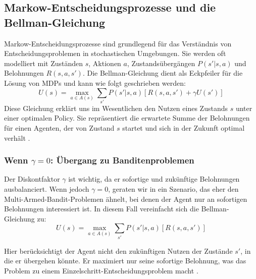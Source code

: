 

\subsection{Markow-Entscheidungsprozesse und die Bellman-Gleichung}

Markow-Entscheidungsprozesse sind grundlegend für das Verständnis von Entscheidungsproblemen in stochastischen Umgebungen. Sie werden oft modelliert mit Zuständen \( s \), Aktionen \( a \), Zustandsübergängen \( P(s' | s, a) \) und Belohnungen \( R(s, a, s') \). Die Bellman-Gleichung dient als Eckpfeiler für die Lösung von MDPs und kann wie folgt geschrieben werden:
\[
U(s) = \max_{a \in A(s)} \sum_{s'} P(s' | s, a) \left[ R(s, a, s') + \gamma U(s') \right]
\label{eq: Bellman }
\]
Diese Gleichung erklärt uns im Wesentlichen den Nutzen eines Zustands \( s \) unter einer optimalen Policy. Sie repräsentiert die erwartete Summe der Belohnungen für einen Agenten, der von Zustand \( s \) startet und sich in der Zukunft optimal verhält \cite{russell2021ai}.

\subsubsection{Wenn \( \gamma = 0 \): Übergang zu Banditenproblemen}
\label{sec: discounted future reward}

Der Diskontfaktor \( \gamma \) ist wichtig, da er sofortige und zukünftige Belohnungen ausbalanciert. Wenn jedoch \( \gamma = 0 \), geraten wir in ein Szenario, das eher den Multi-Armed-Bandit-Problemen ähnelt, bei denen der Agent nur an sofortigen Belohnungen interessiert ist. In diesem Fall vereinfacht sich die Bellman-Gleichung zu:
\[
U(s) = \max_{a \in A(s)} \sum_{s'} P(s' | s, a) \left[ R(s, a, s') \right]
\]

Hier berücksichtigt der Agent nicht den zukünftigen Nutzen der Zustände \( s' \), in die er übergehen könnte. Er maximiert nur seine sofortige Belohnung, was das Problem zu einem Einzelschritt-Entscheidungsproblem macht \cite{SuttonBarto2018}.
